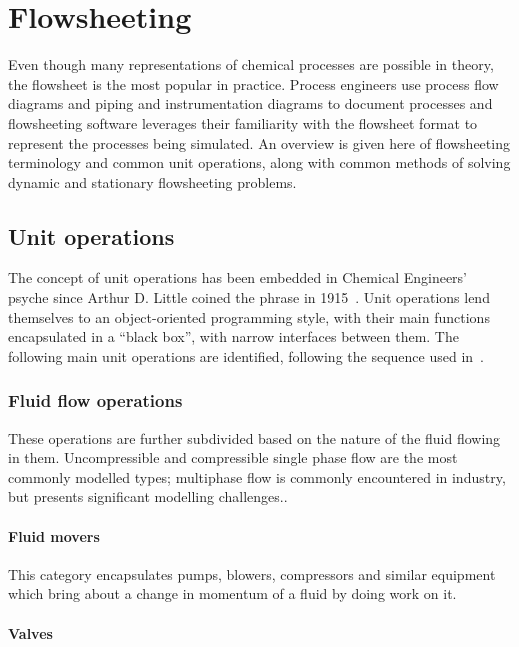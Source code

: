 \chapter{Flowsheeting}

\begin{overview}
  Even though many representations of chemical processes are possible
  in theory, the flowsheet is the most popular in practice.  Process
  engineers use process flow diagrams and piping and instrumentation
  diagrams to document processes and flowsheeting software leverages
  their familiarity with the flowsheet format to represent the
  processes being simulated.  An overview is given here of
  flowsheeting terminology and common unit operations, along with
  common methods of solving dynamic and stationary flowsheeting
  problems.
\end{overview}

\section{Unit operations}
The concept of unit operations has been embedded in Chemical
Engineers' psyche since Arthur D. Little coined the phrase in
1915~\citep{hougenhistory}.  Unit operations lend themselves to an
object-oriented programming style, with their main functions
encapsulated in a ``black box'', with narrow interfaces between them.
The following main unit operations are identified, following the
sequence used in~\citet{msh}.

\subsection{Fluid flow operations}
These operations are further subdivided based on the nature of the
fluid flowing in them.  Uncompressible and compressible single phase
flow are the most commonly modelled types; multiphase flow is commonly
encountered in industry, but presents significant modelling
challenges.\citehere.

\subsubsection{Fluid movers}
This category encapsulates pumps, blowers, compressors and similar
equipment which bring about a change in momentum of a fluid by doing
work on it.  

\subsubsection{Valves}


